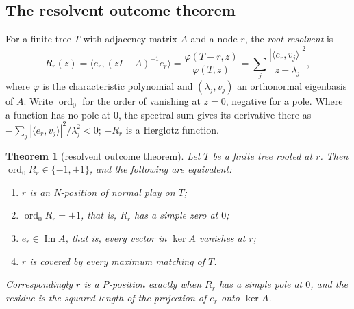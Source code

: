 \documentclass[11pt]{amsart}
\theoremstyle{plain}
\newtheorem{theorem}{Theorem}[section]
\theoremstyle{definition}
\theoremstyle{remark}
\numberwithin{equation}{section}
\newcommand{\ord}{\operatorname{ord}}
\begin{document}
\subsection{The resolvent outcome theorem}
For a finite tree $T$ with adjacency matrix $A$ and a node $r$, the \emph{root resolvent} is
\[
R_r(z)=\bigl\langle e_r,(zI-A)^{-1}e_r\bigr\rangle=\frac{\varphi(T-r,z)}{\varphi(T,z)}=\sum_j\frac{|\langle e_r,v_j\rangle|^2}{z-\lambda_j},
\]
where $\varphi$ is the characteristic polynomial and $(\lambda_j,v_j)$ an orthonormal eigenbasis of $A$. Write $\ord_0$ for the order of vanishing at $z=0$, negative for a pole. Where a function has no pole at $0$, the spectral sum gives its derivative there as $-\sum_j|\langle e_r,v_j\rangle|^2/\lambda_j^2<0$; $-R_r$ is a Herglotz function.

\begin{theorem}[resolvent outcome theorem]\label{thm:resolvent-outcome}
Let $T$ be a finite tree rooted at $r$. Then $\ord_0R_r\in\{-1,+1\}$, and the following are equivalent:
\begin{enumerate}[label=\textup{(\arabic*)}]
\item $r$ is an N-position of normal play on $T$;
\item $\ord_0R_r=+1$, that is, $R_r$ has a simple zero at $0$;
\item $e_r\in\operatorname{Im}A$, that is, every vector in $\ker A$ vanishes at $r$;
\item $r$ is covered by every maximum matching of $T$.
\end{enumerate}
Correspondingly $r$ is a P-position exactly when $R_r$ has a simple pole at $0$, and the residue is the squared length of the projection of $e_r$ onto $\ker A$.
\end{theorem}
\end{document}
